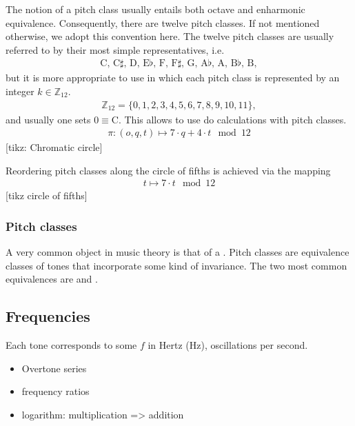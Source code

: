 \documentclass[letterpaper,10pt,english]{sphinxmanual}
\begin{document}
The notion of a pitch class usually entails both octave and enharmonic equivalence.
Consequently, there are twelve pitch classes. If not mentioned otherwise, we adopt this convention here.
The twelve pitch classes are usually referred to by their most simple representatives, i.e.
\begin{equation*}
\begin{split}\text{C, C$\sharp$, D, E$\flat$, F, F$\sharp$, G, A$\flat$, A, B$\flat$, B},\end{split}
\end{equation*}
but it is more appropriate to use  in which each pitch class is represented
by an integer \(k \in \mathbb{Z}_{12}\).
\begin{equation*}
\begin{split}\mathbb{Z}_{12}=\{0, 1, 2, 3, 4, 5, 6, 7, 8, 9, 10, 11\},\end{split}
\end{equation*}
and usually one sets \(0\equiv \text{C}\). This allows to use 
do calculations with pitch classes.
\begin{equation*}
\begin{split}\pi: (o, q, t) \mapsto 7 \cdot q + 4 \cdot t \mod 12\end{split}
\end{equation*}
{[}tikz: Chromatic circle{]}

Reordering pitch classes along the circle of fifths is achieved via the mapping
\begin{equation*}
\begin{split}t \mapsto 7 \cdot t \mod 12\end{split}
\end{equation*}
{[}tikz circle of fifths{]}


\subsubsection{Pitch classes}
\label{\detokenize{2_fundamentals1:pitch-classes}}
A very common object in music theory is that of a . Pitch classes
are equivalence classes of tones that incorporate some kind of invariance.
The two most common equivalences are  and .


\subsection{Frequencies}
\label{\detokenize{2_fundamentals1:frequencies}}
Each tone corresponds to some  \(f\) in Hertz (Hz),
oscillations per second.
\begin{itemize}
\item {} 
Overtone series

\item {} 
frequency ratios

\item {} 
logarithm: multiplication =\textgreater{} addition

\end{itemize}
\end{document}
